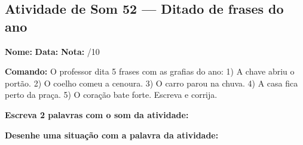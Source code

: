 \subsection{Atividade de Som 52 --- Ditado de frases do ano}
\begin{exercicio}



\noindent\textbf{Nome:} \underline{\hspace{3.2cm}} \quad \textbf{Data:} \underline{\hspace{1.6cm}} \quad \textbf{Nota:} \underline{\hspace{0.9cm}}/10


\noindent\textbf{Comando:} O professor dita 5 frases com as grafias do ano: 1) A chave abriu o portão. 2) O coelho comeu a cenoura. 3) O carro parou na chuva. 4) A casa fica perto da praça. 5) O coração bate forte. Escreva e corrija.


\begin{center}
\end{center}

\noindent\textbf{Escreva 2 palavras com o som da atividade:}

\begin{center}
  \underline{\hspace{3cm}} \quad \underline{\hspace{3cm}}
\end{center}

\noindent\textbf{Desenhe uma situação com a palavra da atividade:}

\begin{center}
\end{center}

\end{exercicio}



